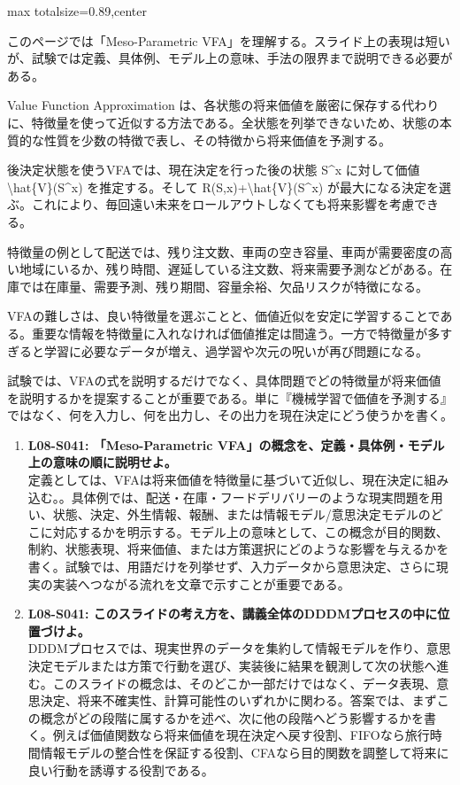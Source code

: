 \begin{minipage}[t]{0.58\textwidth}
\begin{adjustbox}{max totalsize={\textwidth}{0.89\textheight},center}
\begin{minipage}{\textwidth}\scriptsize
{}このページでは「Meso-Parametric VFA」を理解する。スライド上の表現は短いが、試験では定義、具体例、モデル上の意味、手法の限界まで説明できる必要がある。\par
Value Function Approximation は、各状態の将来価値を厳密に保存する代わりに、特徴量を使って近似する方法である。全状態を列挙できないため、状態の本質的な性質を少数の特徴で表し、その特徴から将来価値を予測する。\par
後決定状態を使うVFAでは、現在決定を行った後の状態 S\textasciicircum{}x に対して価値 \textbackslash{}hat\{V\}(S\textasciicircum{}x) を推定する。そして R(S,x)+\textbackslash{}hat\{V\}(S\textasciicircum{}x) が最大になる決定を選ぶ。これにより、毎回遠い未来をロールアウトしなくても将来影響を考慮できる。\par
特徴量の例として配送では、残り注文数、車両の空き容量、車両が需要密度の高い地域にいるか、残り時間、遅延している注文数、将来需要予測などがある。在庫では在庫量、需要予測、残り期間、容量余裕、欠品リスクが特徴になる。\par
VFAの難しさは、良い特徴量を選ぶことと、価値近似を安定に学習することである。重要な情報を特徴量に入れなければ価値推定は間違う。一方で特徴量が多すぎると学習に必要なデータが増え、過学習や次元の呪いが再び問題になる。\par
試験では、VFAの式を説明するだけでなく、具体問題でどの特徴量が将来価値を説明するかを提案することが重要である。単に『機械学習で価値を予測する』ではなく、何を入力し、何を出力し、その出力を現在決定にどう使うかを書く。\par{}\begin{enumerate}\item \textbf{L08-S041: 「Meso-Parametric VFA」の概念を、定義・具体例・モデル上の意味の順に説明せよ。}\\定義としては、VFAは将来価値を特徴量に基づいて近似し、現在決定に組み込む。。具体例では、配送・在庫・フードデリバリーのような現実問題を用い、状態、決定、外生情報、報酬、または情報モデル/意思決定モデルのどこに対応するかを明示する。モデル上の意味として、この概念が目的関数、制約、状態表現、将来価値、または方策選択にどのような影響を与えるかを書く。試験では、用語だけを列挙せず、入力データから意思決定、さらに現実の実装へつながる流れを文章で示すことが重要である。\item \textbf{L08-S041: このスライドの考え方を、講義全体のDDDMプロセスの中に位置づけよ。}\\DDDMプロセスでは、現実世界のデータを集約して情報モデルを作り、意思決定モデルまたは方策で行動を選び、実装後に結果を観測して次の状態へ進む。このスライドの概念は、そのどこか一部だけではなく、データ表現、意思決定、将来不確実性、計算可能性のいずれかに関わる。答案では、まずこの概念がどの段階に属するかを述べ、次に他の段階へどう影響するかを書く。例えば価値関数なら将来価値を現在決定へ戻す役割、FIFOなら旅行時間情報モデルの整合性を保証する役割、CFAなら目的関数を調整して将来に良い行動を誘導する役割である。\end{enumerate}

\end{minipage}
\end{adjustbox}
\end{minipage}
